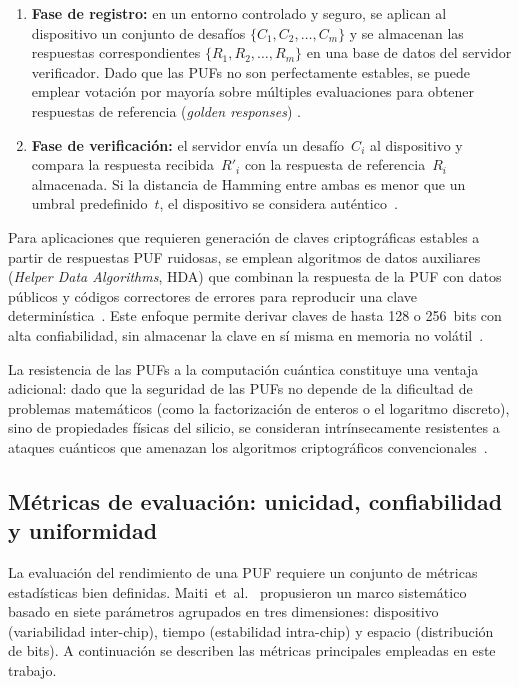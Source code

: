 \begin{enumerate}
  \item \textbf{Fase de registro:} en un entorno controlado y seguro, se
    aplican al dispositivo un conjunto de desafíos $\{C_1, C_2, \ldots,
    C_m\}$ y se almacenan las respuestas correspondientes
    $\{R_1, R_2, \ldots, R_m\}$ en una base de datos del servidor
    verificador. Dado que las PUFs no son perfectamente estables, se puede
    emplear votación por mayoría sobre múltiples evaluaciones para obtener
    respuestas de referencia (\textit{golden responses})
    \cite{maiti_2012_systematic}.
  \item \textbf{Fase de verificación:} el servidor envía un desafío~$C_i$ al
    dispositivo y compara la respuesta recibida~$R'_i$ con la respuesta de
    referencia~$R_i$ almacenada. Si la distancia de Hamming entre ambas es
    menor que un umbral predefinido~$t$, el dispositivo se considera
    auténtico~\cite{shamsoshoara_2020_puf}.
\end{enumerate}

Para aplicaciones que requieren generación de claves criptográficas estables
a partir de respuestas PUF ruidosas, se emplean algoritmos de datos
auxiliares (\textit{Helper Data Algorithms}, HDA) que combinan la respuesta
de la PUF con datos públicos y códigos correctores de errores para reproducir
una clave determinística~\cite{delvaux_2015_helper}. Este enfoque permite
derivar claves de hasta 128 o 256~bits con alta confiabilidad, sin almacenar
la clave en sí misma en memoria no volátil~\cite{delvaux_2015_helper,
farha_2019_physical}.

La resistencia de las PUFs a la computación cuántica constituye una ventaja
adicional: dado que la seguridad de las PUFs no depende de la dificultad de
problemas matemáticos (como la factorización de enteros o el logaritmo
discreto), sino de propiedades físicas del silicio, se consideran
intrínsecamente resistentes a ataques cuánticos que amenazan los algoritmos
criptográficos convencionales~\cite{
shamsoshoara_2020_puf, almeer_2023_puf}.

\subsection{Métricas de evaluación: unicidad, confiabilidad y uniformidad}
\label{sec:metricas}

La evaluación del rendimiento de una PUF requiere un conjunto de métricas
estadísticas bien definidas. Maiti~et~al.~\cite{maiti_2012_systematic}
propusieron un marco sistemático basado en siete parámetros agrupados en tres
dimensiones: dispositivo (variabilidad inter-chip), tiempo (estabilidad
intra-chip) y espacio (distribución de bits). A continuación se describen las
métricas principales empleadas en este trabajo.

